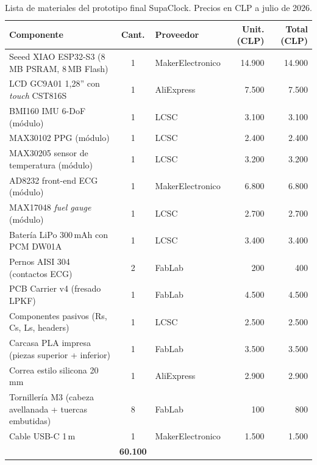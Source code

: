 \documentclass[letterpaper,11pt]{article}
\begin{document}
\begin{table}[H]
    \centering
    \caption{Lista de materiales del prototipo final SupaClock. Precios en CLP a julio de 2026.}
    \label{tab:bom}
    \footnotesize
    \renewcommand{\arraystretch}{1.05}
    \begin{tabular}{|L{4.3cm}|c|L{3.4cm}|r|r|}\hline
    \textbf{Componente} & \textbf{Cant.} & \textbf{Proveedor} & \textbf{Unit. (CLP)} & \textbf{Total (CLP)} \\\hline
    Seeed XIAO ESP32-S3 (8\,MB PSRAM, 8\,MB Flash) & 1 & MakerElectronico & 14.900 & 14.900 \\\hline
    LCD GC9A01 1{,}28'' con \textit{touch} CST816S & 1 & AliExpress & 7.500 & 7.500 \\\hline
    BMI160 IMU 6-DoF (m\'odulo) & 1 & LCSC & 3.100 & 3.100 \\\hline
    MAX30102 PPG (m\'odulo) & 1 & LCSC & 2.400 & 2.400 \\\hline
    MAX30205 sensor de temperatura (m\'odulo) & 1 & LCSC & 3.200 & 3.200 \\\hline
    AD8232 front-end ECG (m\'odulo) & 1 & MakerElectronico & 6.800 & 6.800 \\\hline
    MAX17048 \textit{fuel gauge} (m\'odulo) & 1 & LCSC & 2.700 & 2.700 \\\hline
    Bater\'ia LiPo $300$\,mAh con PCM DW01A & 1 & LCSC & 3.400 & 3.400 \\\hline
    Pernos AISI 304 (contactos ECG) & 2 & FabLab & 200 & 400 \\\hline
    PCB Carrier v4 (fresado LPKF) & 1 & FabLab & 4.500 & 4.500 \\\hline
    Componentes pasivos (Rs, Cs, Ls, headers) & 1 & LCSC & 2.500 & 2.500 \\\hline
    Carcasa PLA impresa (piezas superior + inferior) & 1 & FabLab & 3.500 & 3.500 \\\hline
    Correa estilo silicona 20\,mm & 1 & AliExpress & 2.900 & 2.900 \\\hline
    Tornil\-le\-r\'ia M3 (cabeza avellanada + tuercas embutidas) & 8 & FabLab & 100 & 800 \\\hline
    Cable USB-C 1\,m & 1 & MakerElectronico & 1.500 & 1.500 \\\hline
     & \textbf{60.100} \\\hline
    \end{tabular}
\end{table}
\end{document}
